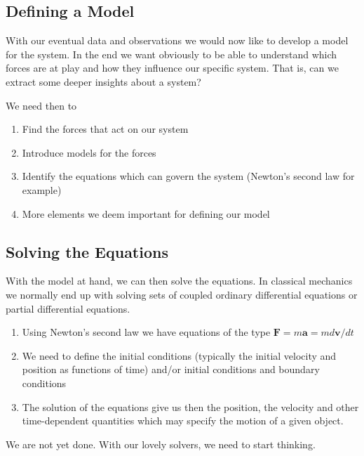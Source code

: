 \documentclass[%
oneside,                 %
final,                   %
10pt]{article}
\begin{document}
\noindent
\subsection*{Defining a Model}

With our eventual data and observations we would now like to develop a
model for the system. In the end we want obviously to be able to
understand which forces are at play and how they influence our
specific system. That is, can we extract some deeper insights about a
system?

We need then to
\begin{enumerate}
\item Find the forces that act on our system

\item Introduce models for the forces

\item Identify the equations which can govern the system (Newton's second law for example)

\item More elements we deem important for defining our model
\end{enumerate}

\noindent
\subsection*{Solving the Equations}

With the model at hand, we can then solve the equations. In classical mechanics we normally end up  with solving sets of coupled ordinary differential equations or partial differential equations.
\begin{enumerate}
\item Using Newton's second law we have equations of the type $\bm{F}=m\bm{a}=md\bm{v}/dt$

\item We need to  define the initial conditions (typically the initial velocity and position as functions of time) and/or initial conditions and boundary conditions

\item The solution of the equations give us then the position, the velocity and other time-dependent quantities which may specify the motion of a given object.
\end{enumerate}

\noindent
We are not yet done. With our lovely solvers, we need to start thinking.
\end{document}
